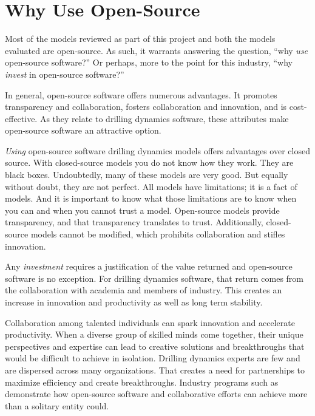 \section{Why Use Open-Source}
Most of the models reviewed as part of this project and both the models evaluated are open-source.  As such, it warrants answering the question, ``why \emph{use} open-source software?''  Or perhaps, more to the point for this industry, ``why \emph{invest} in open-source software?''

In general, open-source software offers numerous advantages.  It promotes transparency and collaboration, fosters collaboration and innovation, and is cost-effective.  As they relate to drilling dynamics software, these attributes make open-source software an attractive option.

\emph{Using} open-source software drilling dynamics models offers advantages over closed source.  With closed-source models you do not know how they work.  They are black boxes.  Undoubtedly, many of these models are very good.  But equally without doubt, they are not perfect.  All models have limitations; it is a fact of models.  And it is important to know what those limitations are to know when you can and when you cannot trust a model.  Open-source models provide transparency, and that transparency translates to trust.  Additionally, closed-source models cannot be modified, which prohibits collaboration and stifles innovation.


Any \emph{investment} requires a justification of the value returned and open-source software is no exception.  For drilling dynamics software, that return comes from the collaboration with academia and members of industry.  This creates an increase in innovation and productivity as well as long term stability.

Collaboration among talented individuals can spark innovation and accelerate productivity.  When a diverse group of skilled minds come together, their unique perspectives and expertise can lead to creative solutions and breakthroughs that would be difficult to achieve in isolation.  Drilling dynamics experts are few and are dispersed across many organizations.  That creates a need for partnerships to maximize efficiency and create breakthroughs.  Industry programs such as \osdu{} demonstrate how open-source software and collaborative efforts can achieve more than a solitary entity could.

